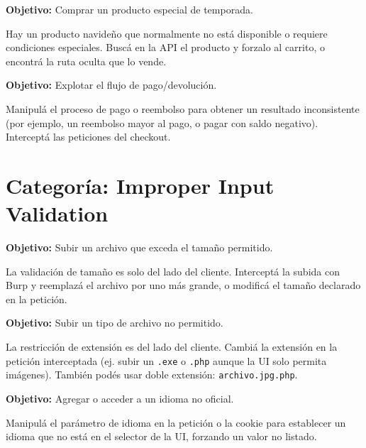 \documentclass[11pt,a4paper]{article}
\begin{document}
\begin{desafio}
\textbf{Objetivo:} Comprar un producto especial de temporada.
\begin{solucion}
Hay un producto navideño que normalmente no está disponible o requiere condiciones especiales. Buscá en la API el producto y forzalo al carrito, o encontrá la ruta oculta que lo vende.
\end{solucion}
\end{desafio}

\begin{desafio}
\textbf{Objetivo:} Explotar el flujo de pago/devolución.
\begin{solucion}
Manipulá el proceso de pago o reembolso para obtener un resultado inconsistente (por ejemplo, un reembolso mayor al pago, o pagar con saldo negativo). Interceptá las peticiones del checkout.
\end{solucion}
\end{desafio}

\section{Categoría: Improper Input Validation}

\begin{desafio}
\textbf{Objetivo:} Subir un archivo que exceda el tamaño permitido.
\begin{solucion}
La validación de tamaño es solo del lado del cliente. Interceptá la subida con Burp y reemplazá el archivo por uno más grande, o modificá el tamaño declarado en la petición.
\end{solucion}
\end{desafio}

\begin{desafio}
\textbf{Objetivo:} Subir un tipo de archivo no permitido.
\begin{solucion}
La restricción de extensión es del lado del cliente. Cambiá la extensión en la petición interceptada (ej. subir un \texttt{.exe} o \texttt{.php} aunque la UI solo permita imágenes). También podés usar doble extensión: \texttt{archivo.jpg.php}.
\end{solucion}
\end{desafio}

\begin{desafio}
\textbf{Objetivo:} Agregar o acceder a un idioma no oficial.
\begin{solucion}
Manipulá el parámetro de idioma en la petición o la cookie para establecer un idioma que no está en el selector de la UI, forzando un valor no listado.
\end{solucion}
\end{desafio}
\end{document}
